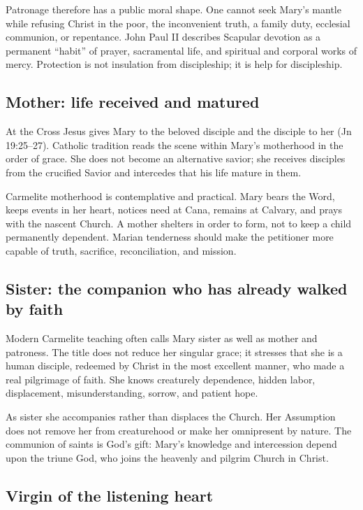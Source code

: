 Patronage therefore has a public moral shape. One cannot seek Mary's mantle while refusing Christ in the poor, the inconvenient truth, a family duty, ecclesial communion, or repentance. John Paul II describes Scapular devotion as a permanent ``habit'' of prayer, sacramental life, and spiritual and corporal works of mercy. Protection is not insulation from discipleship; it is help for discipleship.

\subsection{Mother: life received and matured}

At the Cross Jesus gives Mary to the beloved disciple and the disciple to her (Jn 19:25--27). Catholic tradition reads the scene within Mary's motherhood in the order of grace. She does not become an alternative savior; she receives disciples from the crucified Savior and intercedes that his life mature in them.

Carmelite motherhood is contemplative and practical. Mary bears the Word, keeps events in her heart, notices need at Cana, remains at Calvary, and prays with the nascent Church. A mother shelters in order to form, not to keep a child permanently dependent. Marian tenderness should make the petitioner more capable of truth, sacrifice, reconciliation, and mission.

\subsection{Sister: the companion who has already walked by faith}

Modern Carmelite teaching often calls Mary sister as well as mother and patroness. The title does not reduce her singular grace; it stresses that she is a human disciple, redeemed by Christ in the most excellent manner, who made a real pilgrimage of faith. She knows creaturely dependence, hidden labor, displacement, misunderstanding, sorrow, and patient hope.

As sister she accompanies rather than displaces the Church. Her Assumption does not remove her from creaturehood or make her omnipresent by nature. The communion of saints is God's gift: Mary's knowledge and intercession depend upon the triune God, who joins the heavenly and pilgrim Church in Christ.

\subsection{Virgin of the listening heart}

